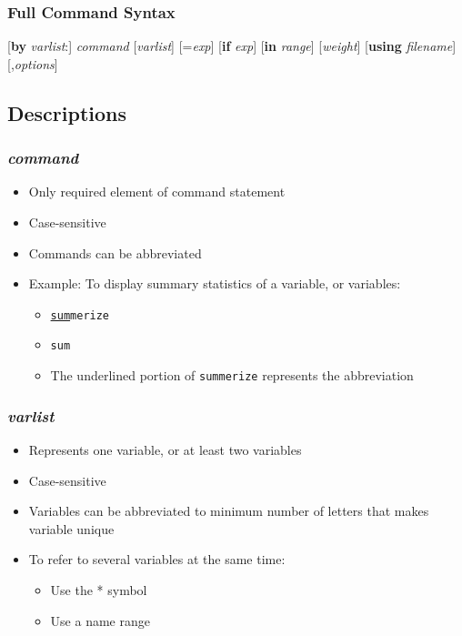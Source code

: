 \documentclass{beamer}
\begin{document}
\begin{frame}
	\frametitle{Full Command Syntax}
		{\tiny [\textbf{by} \textit{varlist}:] \textit{command} [\textit{varlist}] [=\textit{exp}] [\textbf{if} \textit{exp}] [\textbf{in} \textit{range}] [\textit{weight}] [\textbf{using} \textit{filename}] [,\textit{options}]}
\end{frame}

\subsection{Descriptions}

\begin{frame}
	\frametitle{\textit{command}}
		\begin{itemize}
			\item Only required element of command statement
			\item Case-sensitive
			\item Commands can be abbreviated
			\item Example: To display summary statistics of a variable, or variables:
			\begin{itemize}
				\item \texttt{\underline{sum}merize}
				\item \texttt{sum}
				\item The underlined portion of \texttt{summerize} represents the abbreviation
			\end{itemize}
		\end{itemize}
\end{frame}

\begin{frame}
	\frametitle{\textit{varlist}}
		\begin{itemize}
			\item Represents one variable, or at least two variables
			\item Case-sensitive
			\item Variables can be abbreviated to minimum number of letters that makes variable unique
			\item To refer to several variables at the same time:
				\begin{itemize}
					\item Use the * symbol
					\item Use a name range
				\end{itemize}
		\end{itemize}
\end{frame}
\end{document}
